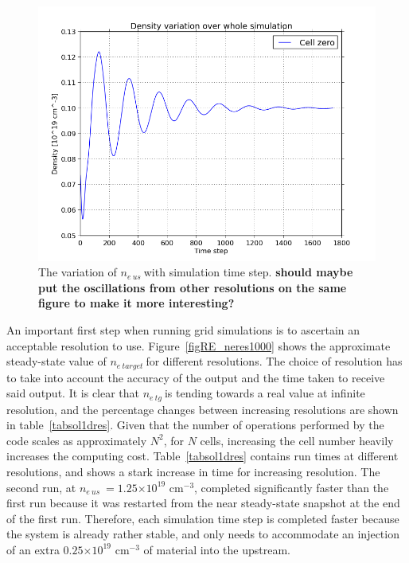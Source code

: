 \documentclass[12pt]{article}  %
\providecommand{\e}[1]{\ensuremath{\times 10^{#1}}} %
\providecommand{\neus}{$n_{e~us}~$} %
\providecommand{\netarget}{$n_{e~target}~$} %
\providecommand{\netg}{$n_{e~tg}~$} %
\begin{document}
\begin{figure}
	\includegraphics[scale=0.4]{Figures/sol1d/ne_var_ny=800.png}
	\centering
	\caption{The variation of \neus with simulation time step. \textbf{should maybe put the oscillations from other resolutions on the same figure to make it more interesting?}}\label{figne_var_ny=800}
\end{figure}

An important first step when running grid simulations is to ascertain an acceptable resolution to use. Figure~\ref{figRE_neres1000} shows the approximate steady-state value of \netarget for different resolutions. The choice of resolution has to take into account the accuracy of the output and the time taken to receive said output. It is clear that \netg is tending towards a real value at infinite resolution, and the percentage changes between increasing resolutions are shown in table~\ref{tabsol1dres}. Given that the number of operations performed by the code scales as approximately $N^2$, for $N$ cells, increasing the cell number heavily increases the computing cost. Table~\ref{tabsol1dres} contains run times at different resolutions, and shows a stark increase in time for increasing resolution. The second run, at \neus $= 1.25\e{19}$ cm$^{-3}$, completed significantly faster than the first run because it was restarted from the near steady-state snapshot at the end of the first run. Therefore, each simulation time step is completed faster because the system is already rather stable, and only needs to accommodate an injection of an extra $0.25\e{19}$ cm$^{-3}$ of material into the upstream.
\end{document}
